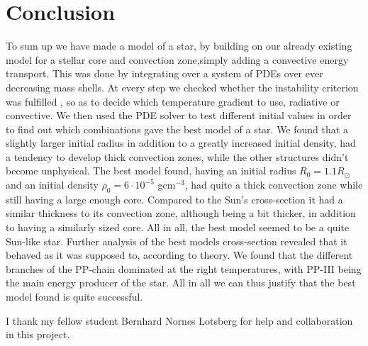 \documentclass{emulateapj}
\begin{document}
	\section*{Conclusion}
	To sum up we have made a model of a star, by building on our already existing model for a stellar core and convection zone,simply adding a convective energy transport. This was done by integrating over a system of PDEs over ever decreasing mass shells. At every step we checked whether the instability criterion was fulfilled , so as to decide which temperature gradient to use, radiative or convective. We then used the PDE solver to test different initial values in order to find out which combinations gave the best model of a star. We found that a slightly larger initial radius in addition to a greatly increased initial density, had a tendency to develop thick convection zones, while the other structures didn't become unphysical. The best model found, having an initial radius $R_0 = 1.1R_\odot$ and an initial density $\rho_0 = 6\cdot 10 ^{-5}$ gcm$^{-3}$, had quite a thick convection zone while still having a large enough core. Compared to the Sun's cross-section it had a similar thickness to its convection zone, although being a bit thicker, in addition to having a similarly sized core. All in all, the best model seemed to be a quite Sun-like star. Further analysis of the best models cross-section revealed that it behaved as it was supposed to, according to theory. We found that the different branches of the PP-chain dominated at the right temperatures, with PP-III being the main energy producer of the star. All in all we can thus justify that the best model found is quite successful.
	

	
	\begin{acknowledgements}
		I thank my fellow student Bernhard Nornes Lotsberg for help and collaboration in this project.
	\end{acknowledgements}



\end{document}
